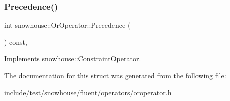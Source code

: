 \subsubsection{\texorpdfstring{Precedence()}{Precedence()}}
{\footnotesize\ttfamily int snowhouse\+::\+Or\+Operator\+::\+Precedence (\begin{DoxyParamCaption}{ }\end{DoxyParamCaption}) const\hspace{0.3cm}{\ttfamily [inline]}, {\ttfamily [virtual]}}



Implements \mbox{\hyperlink{structsnowhouse_1_1ConstraintOperator_ac7c231c1a9f183c0a2cce8544566eeff}{snowhouse\+::\+Constraint\+Operator}}.



The documentation for this struct was generated from the following file\+:\begin{DoxyCompactItemize}
\item 
include/test/snowhouse/fluent/operators/\mbox{\hyperlink{oroperator_8h}{oroperator.\+h}}\end{DoxyCompactItemize}
